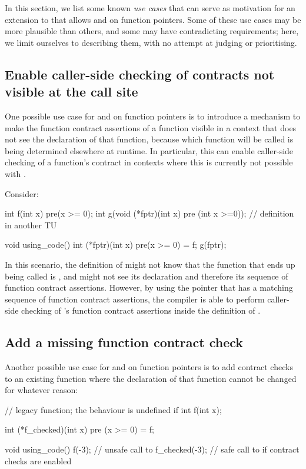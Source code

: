 In this section, we list some known \emph{use cases} that can serve as motivation for an extension to \cite{P2900R8} that allows  and  on function pointers. Some of these use cases may be more plausible than others, and some may have contradicting requirements; here, we limit ourselves to describing them, with no attempt at judging or prioritising.

\subsection{Enable caller-side checking of contracts not visible at the call site}
\label{usecase_ville}

One possible use case for  and  on function pointers is to introduce a mechanism to make the function contract assertions of a function visible in a context that does not see the declaration of that function, because which function will be called is being determined elsewhere at runtime. In particular, this can enable caller-side checking of a function's contract in contexts where this is currently not possible with \cite{P2900R8}.

Consider:
\begin{codeblock}
int f(int x) pre(x >= 0);
int g(void (*fptr)(int x) pre (int x >=0)); // definition in another TU

void using_code() {
   int (*fptr)(int x) pre(x >= 0) = f;
   g(fptr);
}
\end{codeblock}
In this scenario, the definition of  might not know that the function that ends up being called is , and might not see its declaration and therefore its sequence of function contract assertions. However, by using the pointer  that has a matching sequence of function contract assertions, the compiler is able to perform caller-side checking of 's function contract assertions inside the definition of .


\subsection{Add a missing function contract check}
\label{usecase_addmissing}

Another possible use case for  and  on function pointers is to add contract checks to an existing function where the declaration of that function cannot be changed for whatever reason:
\begin{codeblock}
// legacy function; the behaviour is undefined if 
int f(int x);   

int (*f_checked)(int x) pre (x >= 0) = f; 

void using_code() {
  f(-3);          // unsafe call to 
  f_checked(-3);  // safe call to  if contract checks are enabled
}
\end{codeblock}

